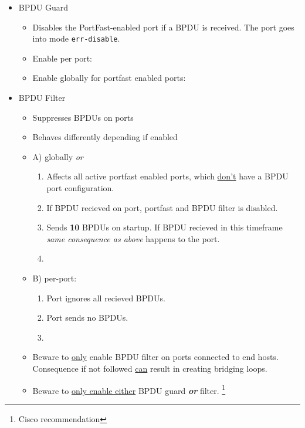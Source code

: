 \begin{itemize}
    \item BPDU Guard
    \begin{itemize}
        \item Disables the PortFast-enabled port if a BPDU is received. The port goes into mode \texttt{err-disable}.
        \item Enable per port:\\
        \item Enable globally for portfast enabled ports:\\
    \end{itemize}
    \item BPDU Filter
    \begin{itemize}
        \item Suppresses BPDUs on ports
        \item Behaves differently depending if enabled
        \item A) globally \textit{or}
        \begin{enumerate}
            \item Affects all active portfast enabled ports, which \underline{don't} have a BPDU port configuration.
            \item If BPDU recieved on port, portfast and BPDU filter is disabled.
            \item Sends \textbf{10} BPDUs on startup. If BPDU recieved in this timeframe \textit{same consequence as above} happens to the port.
            \item {}
        \end{enumerate}
        \item B) per-port:
        \begin{enumerate}
            \item Port ignores all recieved BPDUs.
            \item Port sends no BPDUs.
            \item {}
        \end{enumerate}
        \item Beware to \underline{only} enable BPDU filter on ports connected to end hosts. Consequence if not followed \underline{can} result in creating bridging loops.
        \item Beware to \underline{only enable either} BPDU guard \textbf{\textit{or}} filter. \footnote{Cisco recommendation}

\end{itemize}
\end{itemize}
